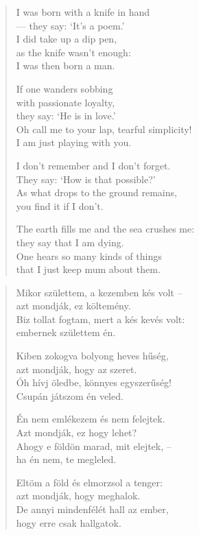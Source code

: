 \documentclass[11pt]{extbook}
\newcommand*{\centeredornament}{\centerline{\pgfornament[width=6cm]{88}}}
\begin{document}
\begin{verse}
  I was born with a knife in hand \\
  --- they say: `It's a poem.' \\
  I did take up a dip pen, \\
  as the knife wasn't enough: \\
  I was then born a man.

  If one wanders sobbing \\
  with passionate loyalty, \\
  they say: `He is in love.' \\
  Oh call me to your lap, tearful simplicity! \\
  I am just playing with you.

  I don't remember and I don't forget. \\
  They say: `How is that possible?' \\
  As what drops to the ground remains, \\
  you find it if I don't.

  The earth fills me and the sea crushes me: \\
  they say that I am dying. \\
  One hears so many kinds of things \\
  that I just keep mum about them.
\end{verse}

\newpage

\vspace*{-15mm}
\centeredornament



\begin{verse}
  Mikor születtem, a kezemben kés volt -- \\
  azt mondják, ez költemény. \\
  Biz tollat fogtam, mert a kés kevés volt: \\
  embernek születtem én.

  Kiben zokogva bolyong heves hűség, \\
  azt mondják, hogy az szeret. \\
  Óh hívj öledbe, könnyes egyszerűség! \\
  Csupán játszom én veled.

  Én nem emlékezem és nem felejtek. \\
  Azt mondják, ez hogy lehet? \\
  Ahogy e földön marad, mit elejtek, -- \\
  ha én nem, te megleled.

  Eltöm a föld és elmorzsol a tenger: \\
  azt mondják, hogy meghalok. \\
  De annyi mindenfélét hall az ember, \\
  hogy erre csak hallgatok.
\end{verse}
\end{document}
